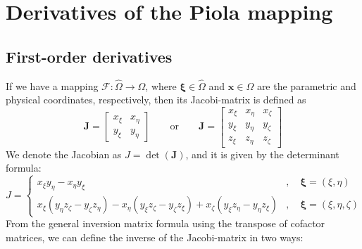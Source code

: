 \documentclass{article}
\newcommand{\bxi}{\boldsymbol{\xi}}
\begin{document}
\section{Derivatives of the Piola mapping}

\subsection{First-order derivatives}\noindent
If we have a mapping $\mathcal{F}:\widehat{\Omega}\to\Omega$, where $\bxi\in\widehat{\Omega}$ and $\mathbf{x}\in\Omega$ are the parametric and physical coordinates, respectively, then its Jacobi-matrix is defined as
\begin{equation}\label{Jacobi}
\mathbf{J} = \begin{bmatrix} x_{\xi} & x_{\eta} \\ y_{\xi} & y_{\eta} \end{bmatrix}
\qquad\text{or}\qquad
\mathbf{J} = \begin{bmatrix} x_{\xi} & x_{\eta} & x_{\zeta} \\ y_{\xi} & y_{\eta} & y_{\zeta} \\ z_{\xi} & z_{\eta} & z_{\zeta} \end{bmatrix}
\end{equation}
We denote the Jacobian as $J = \det(\mathbf{J})$, and it is given by the determinant formula:
\begin{equation}\label{Jacobian}
J = \begin{cases}
x_{\xi}y_{\eta}-x_{\eta}y_{\xi}																	&,\quad\bxi = (\xi,\eta) \\
x_{\xi}(y_{\eta}z_{\zeta}-y_{\zeta}z_{\eta})-x_{\eta}(y_{\xi}z_{\zeta}-y_{\zeta}z_{\xi})+x_{\zeta}(y_{\xi}z_{\eta}-y_{\eta}z_{\xi})	&,\quad\bxi = (\xi,\eta,\zeta)
\end{cases}
\end{equation}
From the general inversion matrix formula using the transpose of cofactor matrices, we can define the inverse of the Jacobi-matrix in two ways:
\end{document}

